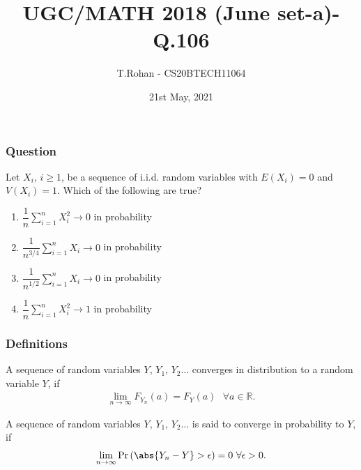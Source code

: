 \documentclass{beamer}
\title{UGC/MATH 2018 (June set-a)-Q.106}
\author{T.Rohan - CS20BTECH11064}
\date{21st May, 2021}
\providecommand{\pr}[1]{\ensuremath{\Pr\left(#1\right)}}
\begin{document}
\begin{frame}
\titlepage
\end{frame}

\begin{frame}
\frametitle{Question}

\begin{block}{}
 Let ${X_i}$, ${i \geq 1}$, be a sequence of i.i.d. random variables with $E(X_i)=0$ and $V(X_i)=1$. Which of the following are true?
\vspace{0.2cm}
\begin{enumerate}
    \item $\dfrac{1}{n} \sum_{i=1}^n X_i^2 \to 0$ in probability 
    \item $\dfrac{1}{n^{3/4}} \sum_{i=1}^n X_i \to 0$ in probability 
    \item $\dfrac{1}{n^{1/2}} \sum_{i=1}^n X_i \to 0$ in probability 
    \item $\dfrac{1}{n} \sum_{i=1}^n X_i^2 \to 1$ in probability
\end{enumerate}
\end{block}
\end{frame}
\begin{frame}{}
\frametitle{Definitions}

\begin{definition} \label{def1}
    A sequence of random variables $Y$, $Y_1$, $Y_2 \ldots$   converges in distribution to a random variable $Y$, if
    \begin{align}
        \lim_{n \to \infty}F_{Y_{n}} (a) = F_{Y} (a)  \text{  }\forall a \in \mathbb{R}.
    \end{align}
\end{definition}
\begin{definition} \label{def2}
    A sequence of random variables $Y$, $Y_1$, $Y_2 \ldots$ is said to converge in probability to $Y$, if
    \begin{align}
        \lim_{n \to \infty}\pr{\abs{Y_n - Y} > \epsilon} = 0  \text{  }\forall \epsilon > 0.
    \end{align}
\end{definition}

\end{frame}
\end{document}
